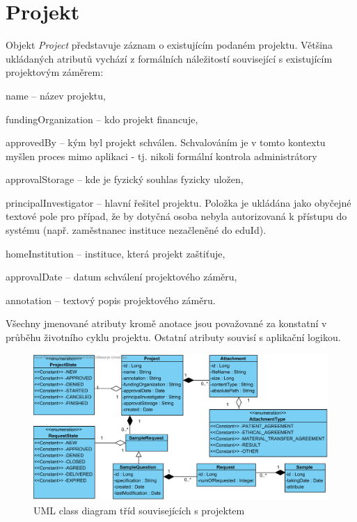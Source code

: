 \section{Projekt}
Objekt \textit{Project} představuje záznam o existujícím podaném projektu. Většina ukládaných atributů vychází z formálních náležitostí související s existujícím projektovým záměrem:
\begin{compactitem}
	\item name -- název projektu,
	\item fundingOrganization -- kdo projekt financuje,	
	\item approvedBy -- kým byl projekt schválen. Schvalováním je v tomto kontextu myšlen proces mimo aplikaci - tj. nikoli formální kontrola administrátory \ProjectName
	\item approvalStorage -- kde je fyzický souhlas fyzicky uložen,
	\item principalInvestigator -- hlavní řešitel projektu. Položka je ukládána jako obyčejné textové pole pro případ, že by dotyčná osoba nebyla autorizovaná k přístupu do systému (např. zaměstnanec instituce nezačleněné do eduId).
	\item homeInstitution -- instituce, která projekt zaštiťuje,
	\item approvalDate -- datum schválení projektového záměru,
	\item annotation -- textový popis projektového záměru.
\end{compactitem}
Všechny jmenované atributy kromě anotace jsou považované za konstatní v průběhu životního cyklu projektu. Ostatní atributy souvisí s aplikační logikou. 

\begin{figure}[h!]
\begin{center}
	\includegraphics[width=\textwidth]{ProjectView}
\caption{UML class diagram tříd souvisejících s projektem}
\label{fig:index:uml:class:project}
\end{center}
\end{figure}

